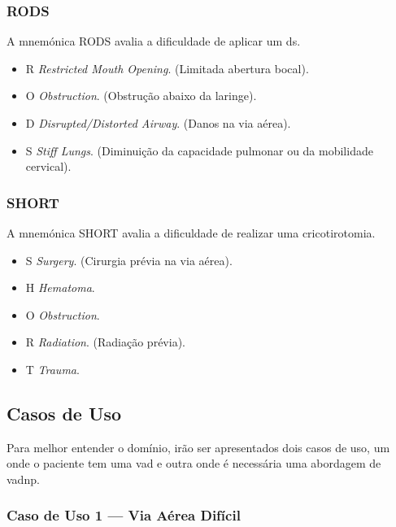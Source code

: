 \documentclass[a4paper,12pt,twoside]{article}
\begin{document}
    \subsubsection{RODS}
    A mnemónica \gls{RODS} avalia a dificuldade de aplicar um \gls{ds}.
    \begin{itemize}
        \item R \textrightarrow \textit{ Restricted Mouth Opening}. (Limitada abertura bocal).
        \item O \textrightarrow \textit{ Obstruction}. (Obstrução abaixo da laringe).
        \item D \textrightarrow \textit{ Disrupted/Distorted Airway}. (Danos na via aérea).
        \item S \textrightarrow \textit{ Stiff Lungs}. (Diminuição da capacidade pulmonar ou da mobilidade cervical).
    \end{itemize}

    \subsubsection{SHORT}
    A mnemónica \gls{SHORT} avalia a dificuldade de realizar uma \gls{cricotirotomia}.
    \begin{itemize}
        \item S \textrightarrow \textit{ Surgery}. (Cirurgia prévia na via aérea).
        \item H \textrightarrow \textit{ Hematoma}.
        \item O \textrightarrow \textit{ Obstruction}.
        \item R \textrightarrow \textit{ Radiation}. (Radiação prévia).
        \item T \textrightarrow \textit{ Trauma}.
    \end{itemize} 

    \subsection{Casos de Uso}
    Para melhor entender o domínio, irão ser apresentados dois casos de uso, um onde o paciente tem uma \gls{vad} e outra onde é necessária uma abordagem de \gls{vadnp}.
    \subsubsection{Caso de Uso 1 --- Via Aérea Difícil}
\end{document}
